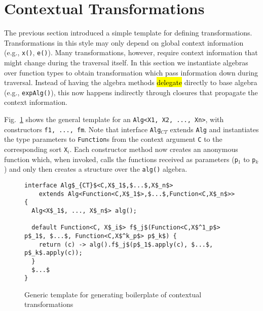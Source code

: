 \section{Contextual Transformations}\label{sec:contexttrans}

The previous section introduced a simple template for defining transformations.
Transformations in this style may only depend on global context information (e.g., \lstinline{x()}, \lstinline{e()}).
Many transformations, however, require context information that might change during the traversal itself.
In this section we instantiate algebras over function types to obtain transformation which pass information down during traversal.
Instead of having the algebra methods \hl{delegate} directly to base algebra (e.g., \lstinline{expAlg()}), this now happens indirectly through closures that propagate the context information.

Fig.~\ref{ctxTrafoTemplate} shows the general template for an \lstinline{Alg<X1, X2, ..., Xn>}, with constructors \lstinline{f1, ..., fm}.
Note that interface \lstinline{Alg}$_{CT}$ extends \lstinline{Alg} and instantiates the type parameters to \lstinline{Function}s from the context argument \lstinline{C} to the corresponding sort \lstinline{X}$_i$.
Each constructor method now creates an anonymous function which, when invoked, calls the functions received as parameters (\lstinline{p}$_1$ to \lstinline{p}$_k$) and only then creates a structure over the \lstinline{alg()} algebra.

\begin{figure}[t]
\nocaptionrule
\begin{lstlisting}[mathescape=true]
interface Alg$_{CT}$<C,X$_1$,$...$,X$_n$>
    extends Alg<Function<C,X$_1$>,$...$,Function<C,X$_n$>> {
  Alg<X$_1$, ..., X$_n$> alg();

  default Function<C, X$_i$> f$_j$(Function<C,X$^1_p$> p$_1$, $...$, Function<C,X$^k_p$> p$_k$) {
    return (c) -> alg().f$_j$(p$_1$.apply(c), $...$, p$_k$.apply(c));
  }
  $...$
}
\end{lstlisting}
\caption{Generic template for generating boilerplate of contextual transformations}
\label{ctxTrafoTemplate}
\end{figure}

